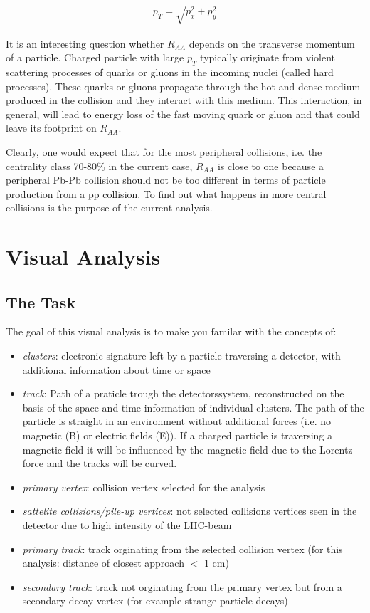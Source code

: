 \documentclass{article}
\begin{document}
\begin{eqnarray*}
  p_{T} = \sqrt{p_x^2 + p_y^2}
\end{eqnarray*}

It is an interesting question whether $R_{AA}$ depends on the transverse
momentum of a particle. Charged particle with large $p_T$ typically originate
from violent scattering processes of quarks or gluons in the incoming nuclei
(called hard processes). These quarks or gluons propagate through the hot and
dense medium produced in the collision and they interact with this medium.
This interaction, in general, will lead to energy loss of the fast moving
quark or gluon and that could leave its footprint on $R_{AA}$.

Clearly, one would expect that for the most peripheral collisions, i.e.
the centrality class 70-80\% in the current case, $R_{AA}$ is close to one
because a peripheral Pb-Pb collision should not be too different in terms
of particle production from a pp collision. To find out what happens in
more central collisions is the purpose of the current analysis.

\section{Visual Analysis}
\subsection{The Task}
The goal of this visual analysis is to make you familar with the concepts of:

\begin{itemize}
\item \textit{clusters}: electronic signature left by a particle traversing a 
  detector, with additional information about time or space
\item \textit{track}: Path of a praticle trough the detectorssystem, 
  reconstructed on the basis of the space and time information of individual 
  clusters. The path of the particle is straight in an environment without 
  additional forces (i.e. no magnetic (B) or electric fields (E)). If a charged
  particle is traversing a magnetic field it will be influenced by the magnetic
  field due to the Lorentz force and the tracks will be curved. 
\item \textit{primary vertex}: collision vertex selected for the analysis
\item \textit{sattelite collisions/pile-up vertices}: not selected collisions 
  vertices seen in the detector due to high intensity of the LHC-beam
\item \textit{primary track}: track orginating from the selected collision 
  vertex (for this analysis: distance of closest approach $<$ 1 cm)
\item \textit{secondary track}: track not orginating from the primary vertex 
  but from a secondary decay vertex (for example strange particle decays)
\end{itemize}
\end{document}
